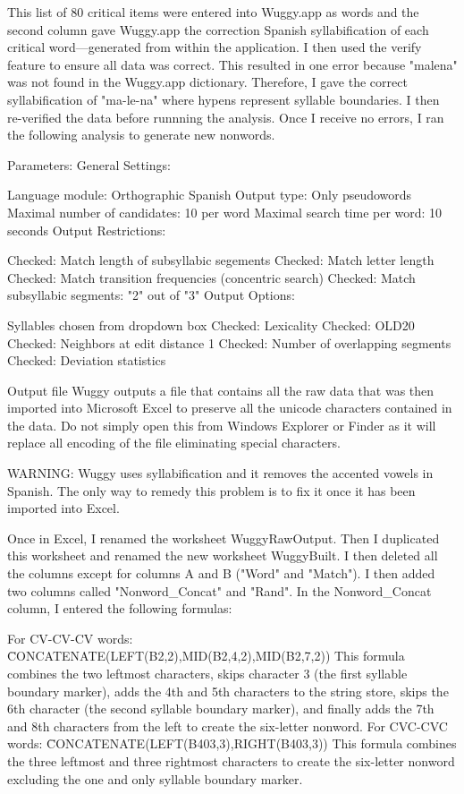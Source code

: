 \documentclass[
12pt, %
english, %
doublespacing, %
nolistspacing, %
liststotoc, %
headsepline, %
chapterinoneline, %
openany, %
]{DoctoralThesis}\usepackage[]{graphicx}\usepackage[]{color}
\begin{document}
\label{AppendixA} %

This list of 80 critical items were entered into Wuggy.app as words and the second column gave Wuggy.app the correction Spanish syllabification of each critical word—generated from within the application. I then used the verify feature to ensure all data was correct. This resulted in one error because "malena" was not found in the Wuggy.app dictionary. Therefore, I gave the correct syllabification of "ma-le-na" where hypens represent syllable boundaries. I then re-verified the data before runnning the analysis. Once I receive no errors, I ran the following analysis to generate new nonwords.

Parameters:
General Settings:

Language module: Orthographic Spanish
Output type: Only pseudowords
Maximal number of candidates: 10 per word
Maximal search time per word: 10 seconds
Output Restrictions:

Checked: Match length of subsyllabic segements
Checked: Match letter length
Checked: Match transition frequencies (concentric search)
Checked: Match subsyllabic segments: "2" out of "3"
Output Options:

Syllables chosen from dropdown box
Checked: Lexicality
Checked: OLD20
Checked: Neighbors at edit distance 1
Checked: Number of overlapping segments
Checked: Deviation statistics

Output file
Wuggy outputs a file that contains all the raw data that was then imported into Microsoft Excel to preserve all the unicode characters contained in the data. Do not simply open this from Windows Explorer or Finder as it will replace all encoding of the file eliminating special characters.

WARNING: Wuggy uses syllabification and it removes the accented vowels in Spanish. The only way to remedy this problem is to fix it once it has been imported into Excel.

Once in Excel, I renamed the worksheet WuggyRawOutput. Then I duplicated this worksheet and renamed the new worksheet WuggyBuilt. I then deleted all the columns except for columns A and B ("Word" and "Match"). I then added two columns called "Nonword\_Concat" and "Rand". In the Nonword\_Concat column, I entered the following formulas:

For CV-CV-CV words: \=CONCATENATE(LEFT(B2,2),MID(B2,4,2),MID(B2,7,2))
This formula combines the two leftmost characters, skips character 3 (the first syllable boundary marker), adds the 4th and 5th characters to the string store, skips the 6th character (the second syllable boundary marker), and finally adds the 7th and 8th characters from the left to create the six-letter nonword.
For CVC-CVC words: \=CONCATENATE(LEFT(B403,3),RIGHT(B403,3))
This formula combines the three leftmost and three rightmost characters to create the six-letter nonword excluding the one and only syllable boundary marker.
\end{document}
